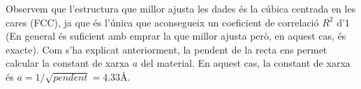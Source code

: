 \documentclass[a4paper, 11pt]{article}
\begin{document}
\noindent Observem que l'estructura que millor ajusta les dades és la cúbica centrada en les cares (FCC), ja que és l'única que aconsegueix un coeficient de correlació $R^2$ d'1 (En general és suficient amb emprar la que millor ajusta però, en aquest cas, és exacte). Com s'ha explicat anteriorment, la pendent de la recta ens permet calcular la constant de xarxa $a$ del material. En aquest cas, la constant de xarxa és $a = 1/\sqrt{pendent} = 4.33 \text{\AA}$.

\end{document}
